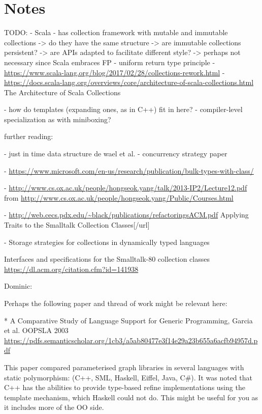 \documentclass[sigconf, 10pt]{acmart}
\begin{document}
\section{Notes}

\begin{note}
TODO:
- Scala
  - has collection framework with mutable and immutable collections
    -> do they have the same structure 
    -> are immutable collections persistent?
    -> are APIs adapted to facilitate different style?
      -> perhaps not necessary since Scala embraces FP
  - uniform return type principle
  - \url{https://www.scala-lang.org/blog/2017/02/28/collections-rework.html}
 - \url{https://docs.scala-lang.org/overviews/core/architecture-of-scala-collections.html} 
   The Architecture of Scala Collections  


- how do templates (expanding ones, as in C++) fit in here?
- compiler-level specialization as with miniboxing?

further reading:

- just in time data structure de wael et al.
- concurrency strategy paper

 - \url{https://www.microsoft.com/en-us/research/publication/bulk-types-with-class/}

 - \url{http://www.cs.ox.ac.uk/people/hongseok.yang/talk/2013-IP2/Lecture12.pdf}
   from \url{http://www.cs.ox.ac.uk/people/hongseok.yang/Public/Courses.html}
 
 - \url{http://web.cecs.pdx.edu/~black/publications/refactoringsACM.pdf}
   Applying Traits to the Smalltalk Collection Classes[/url]
 
 - Storage strategies for collections in dynamically typed languages \citep{Bolz:2013:SSC}

Interfaces and specifications for the Smalltalk-80 collection classes
\url{https://dl.acm.org/citation.cfm?id=141938}


Dominic:

Perhaps the following paper and thread of work might be relevant here:

* A Comparative Study of Language Support for Generic Programming, Garcia et al. OOPSLA 2003
\url{https://pdfs.semanticscholar.org/1cb3/a5ab80477e3f14e29a23b655a6acfb94957d.pdf}

This paper compared parameterised graph libraries in several languages with static polymorphism: (C++, SML, Haskell, Eiffel, Java, C\#). It was noted that C++ has the abilities to provide type-based refine implementations using the template mechanism, which Haskell could not do. This might be useful for you as it includes more of the OO side.


\end{note}
\end{document}

